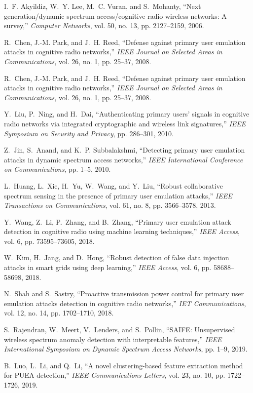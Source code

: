 \documentclass[conference]{IEEEtran}
\begin{document}

\begin{thebibliography}{00}

I.~F. Akyildiz, W.~Y. Lee, M.~C. Vuran, and S.~Mohanty, ``Next generation/dynamic spectrum access/cognitive radio wireless networks: A survey,'' \emph{Computer Networks}, vol. 50, no. 13, pp. 2127--2159, 2006.

R.~Chen, J.-M. Park, and J.~H. Reed, ``Defense against primary user emulation attacks in cognitive radio networks,'' \emph{IEEE Journal on Selected Areas in Communications}, vol. 26, no. 1, pp. 25--37, 2008.

R.~Chen, J.-M. Park, and J.~H. Reed, ``Defense against primary user emulation attacks in cognitive radio networks,'' \emph{IEEE Journal on Selected Areas in Communications}, vol. 26, no. 1, pp. 25--37, 2008.

Y.~Liu, P.~Ning, and H.~Dai, ``Authenticating primary users' signals in cognitive radio networks via integrated cryptographic and wireless link signatures,'' \emph{IEEE Symposium on Security and Privacy}, pp. 286--301, 2010.

Z.~Jin, S.~Anand, and K.~P. Subbalakshmi, ``Detecting primary user emulation attacks in dynamic spectrum access networks,'' \emph{IEEE International Conference on Communications}, pp. 1--5, 2010.

L.~Huang, L.~Xie, H.~Yu, W.~Wang, and Y.~Liu, ``Robust collaborative spectrum sensing in the presence of primary user emulation attacks,'' \emph{IEEE Transactions on Communications}, vol. 61, no. 8, pp. 3566--3578, 2013.

Y.~Wang, Z.~Li, P.~Zhang, and B.~Zhang, ``Primary user emulation attack detection in cognitive radio using machine learning techniques,'' \emph{IEEE Access}, vol. 6, pp. 73595--73605, 2018.

W.~Kim, H.~Jang, and D.~Hong, ``Robust detection of false data injection attacks in smart grids using deep learning,'' \emph{IEEE Access}, vol. 6, pp. 58688--58698, 2018.

N.~Shah and S.~Sastry, ``Proactive transmission power control for primary user emulation attacks detection in cognitive radio networks,'' \emph{IET Communications}, vol. 12, no. 14, pp. 1702--1710, 2018.

S.~Rajendran, W.~Meert, V.~Lenders, and S.~Pollin, ``SAIFE: Unsupervised wireless spectrum anomaly detection with interpretable features,'' \emph{IEEE International Symposium on Dynamic Spectrum Access Networks}, pp. 1--9, 2019.

B.~Luo, L.~Li, and Q.~Li, ``A novel clustering-based feature extraction method for PUEA detection,'' \emph{IEEE Communications Letters}, vol. 23, no. 10, pp. 1722--1726, 2019.

\end{thebibliography}
\end{document}
